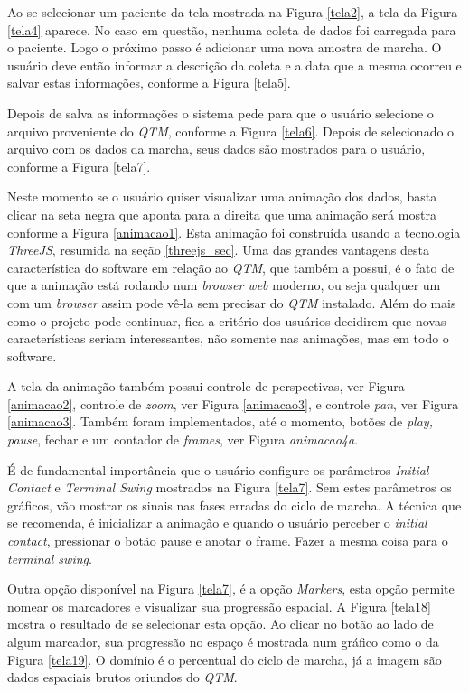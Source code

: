 Ao se selecionar um paciente da tela mostrada na Figura \ref{tela2}, a tela da Figura \ref{tela4} aparece. No caso em questão, nenhuma coleta de dados foi carregada para o paciente. Logo o próximo passo é adicionar uma nova amostra de marcha.
O usuário deve então informar a descrição da coleta e a data que a mesma ocorreu e salvar estas informações, conforme a Figura \ref{tela5}.


Depois de salva as informações o sistema pede para que o usuário selecione o arquivo proveniente do \emph{QTM}, conforme a Figura \ref{tela6}.
Depois de selecionado o arquivo com os dados da marcha, seus dados são mostrados para o usuário, conforme a Figura \ref{tela7}.


Neste momento se o usuário quiser visualizar uma animação dos dados, basta clicar na seta negra que aponta para a direita que uma animação será mostra conforme a Figura \ref{animacao1}.
Esta animação foi construída usando a tecnologia \emph{ThreeJS}, resumida na seção \ref{threejs_sec}. Uma das grandes vantagens desta característica do software em relação ao \emph{QTM}, que também a possui, é o fato de que a animação está rodando num \emph{browser web} moderno, ou seja qualquer um com um \emph{browser} assim pode vê-la sem precisar do \emph{QTM} instalado. 
Além do mais como o projeto pode continuar, fica a critério dos usuários decidirem que novas características seriam interessantes, não somente nas animações, mas em todo o software.

A tela da animação também possui controle de perspectivas, ver Figura \ref{animacao2}, controle de \emph{zoom}, ver Figura \ref{animacao3}, e controle \emph{pan}, ver Figura \ref{animacao3}.
Também foram implementados, até o momento, botões de \emph{play, pause}, fechar e um contador de \emph{frames}, ver Figura \emph{animacao4a}.




É de fundamental importância que o usuário configure os parâmetros \emph{Initial Contact} e \emph{Terminal Swing} mostrados na Figura \ref{tela7}. Sem estes parâmetros os gráficos, vão mostrar os sinais nas fases erradas do ciclo de marcha.
A técnica que se recomenda, é inicializar a animação e quando o usuário perceber o \emph{initial contact}, pressionar o botão pause e anotar o frame. Fazer a mesma coisa para o \emph{terminal swing}.

Outra opção disponível na Figura \ref{tela7}, é a opção \emph{Markers}, esta opção permite nomear os marcadores e visualizar sua progressão espacial. A Figura \ref{tela18} mostra o resultado de se selecionar esta opção.
Ao clicar no botão ao lado de algum marcador, sua progressão no espaço é mostrada num gráfico como o da Figura \ref{tela19}. O domínio é o percentual do ciclo de marcha, já a imagem são dados espaciais brutos oriundos do \emph{QTM}.


